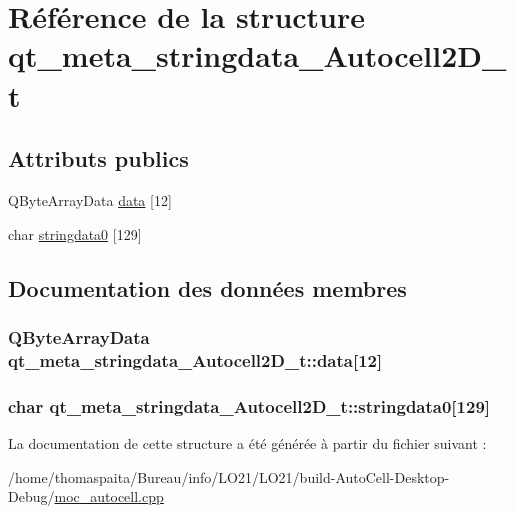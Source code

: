 \hypertarget{structqt__meta__stringdata___autocell2_d__t}{}\section{Référence de la structure qt\+\_\+meta\+\_\+stringdata\+\_\+\+Autocell2\+D\+\_\+t}
\label{structqt__meta__stringdata___autocell2_d__t}
\subsection*{Attributs publics}
\begin{DoxyCompactItemize}
\item 
Q\+Byte\+Array\+Data \hyperlink{structqt__meta__stringdata___autocell2_d__t_a638a1507442e609739b5de7f12377002}{data} \mbox{[}12\mbox{]}
\item 
char \hyperlink{structqt__meta__stringdata___autocell2_d__t_abb1f63b6d95e8f7dfa1925caf0601041}{stringdata0} \mbox{[}129\mbox{]}
\end{DoxyCompactItemize}


\subsection{Documentation des données membres}
\subsubsection[{\texorpdfstring{data}{data}}]{\setlength{\rightskip}{0pt plus 5cm}Q\+Byte\+Array\+Data qt\+\_\+meta\+\_\+stringdata\+\_\+\+Autocell2\+D\+\_\+t\+::data\mbox{[}12\mbox{]}}\hypertarget{structqt__meta__stringdata___autocell2_d__t_a638a1507442e609739b5de7f12377002}{}\label{structqt__meta__stringdata___autocell2_d__t_a638a1507442e609739b5de7f12377002}
\subsubsection[{\texorpdfstring{stringdata0}{stringdata0}}]{\setlength{\rightskip}{0pt plus 5cm}char qt\+\_\+meta\+\_\+stringdata\+\_\+\+Autocell2\+D\+\_\+t\+::stringdata0\mbox{[}129\mbox{]}}\hypertarget{structqt__meta__stringdata___autocell2_d__t_abb1f63b6d95e8f7dfa1925caf0601041}{}\label{structqt__meta__stringdata___autocell2_d__t_abb1f63b6d95e8f7dfa1925caf0601041}


La documentation de cette structure a été générée à partir du fichier suivant \+:\begin{DoxyCompactItemize}
\item 
/home/thomaspaita/\+Bureau/info/\+L\+O21/\+L\+O21/build-\/\+Auto\+Cell-\/\+Desktop-\/\+Debug/\hyperlink{moc__autocell_8cpp}{moc\+\_\+autocell.\+cpp}\end{DoxyCompactItemize}
